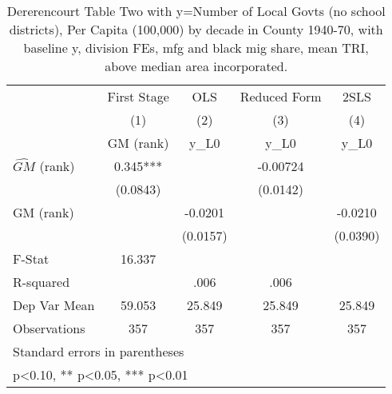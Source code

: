 \begin{table}[htbp]\centering
\def\sym#1{\ifmmode^{#1}\else\(^{#1}\)\fi}
\caption{Dererencourt Table Two with y=Number of Local Govts (no school districts), Per Capita (100,000) by decade in County 1940-70, with baseline y, division FEs, mfg and black mig share, mean TRI, above median area incorporated.}
\begin{tabular}{l*{4}{c}}
\toprule
                    & First Stage   &         OLS   &Reduced Form   &        2SLS   \\
                    &\multicolumn{1}{c}{(1)}&\multicolumn{1}{c}{(2)}&\multicolumn{1}{c}{(3)}&\multicolumn{1}{c}{(4)}\\
                    &\multicolumn{1}{c}{GM  (rank)}&\multicolumn{1}{c}{y\_L0}&\multicolumn{1}{c}{y\_L0}&\multicolumn{1}{c}{y\_L0}\\
\midrule
$\hat{GM}$ (rank)   &       0.345***&               &    -0.00724   &               \\
                    &    (0.0843)   &               &    (0.0142)   &               \\
\addlinespace
GM  (rank)          &               &     -0.0201   &               &     -0.0210   \\
                    &               &    (0.0157)   &               &    (0.0390)   \\
\midrule
F-Stat              &      16.337   &               &               &               \\
R-squared           &               &        .006   &        .006   &               \\
Dep Var Mean        &      59.053   &      25.849   &      25.849   &      25.849   \\
Observations        &         357   &         357   &         357   &         357   \\
\bottomrule
\multicolumn{5}{l}{\footnotesize Standard errors in parentheses}\\
\multicolumn{5}{l}{\footnotesize * p<0.10, ** p<0.05, *** p<0.01}\\
\end{tabular}
\end{table}
